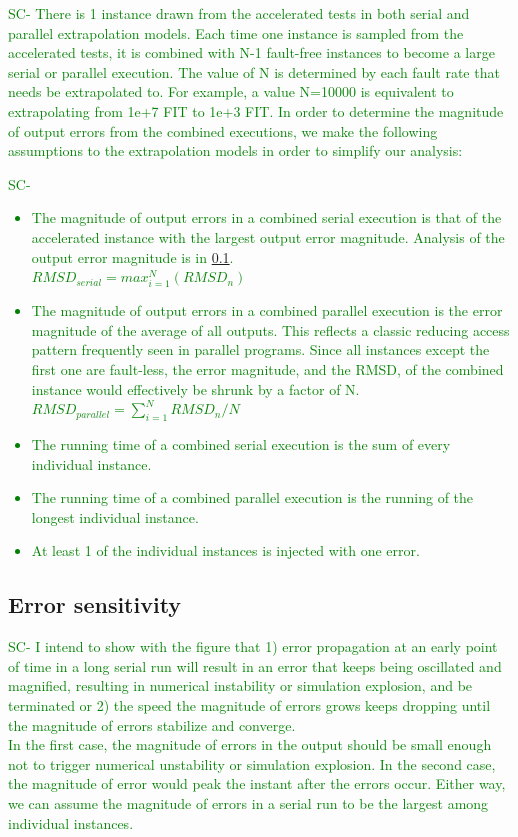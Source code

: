 \documentclass{sig-alternate}
\newcommand{\sui}[1]{%
  \textcolor{green}{SC-#1}
}
\begin{document}
\sui{
There is 1 instance drawn from the accelerated tests in both serial and parallel extrapolation models. Each time one instance is sampled
from the accelerated tests, it is combined with N-1 fault-free instances to become a large serial or parallel execution. The value of N is determined
by each fault rate that needs be extrapolated to. For example, a value N=10000 is equivalent to extrapolating from 1e+7 FIT to 1e+3 FIT.
In order to determine the magnitude of output errors from the combined executions, we make the following assumptions to the extrapolation models
in order to simplify our analysis:
}

\sui{
\begin{itemize}
\item{
The magnitude of output errors in a combined serial execution is that of the accelerated instance with the largest output error magnitude.
Analysis of the output error magnitude is in \ref{sec:eval:errorsensitivity}.\\
$RMSD_{serial} = max_{i=1}^{N} (RMSD_n)$}
\item{The magnitude of output errors in a combined parallel execution is the error magnitude of the average of all outputs. 
This reflects a classic reducing access pattern frequently seen in parallel programs. Since all instances except the first one
are fault-less, the error magnitude, and the RMSD, of the combined instance would effectively be shrunk by a factor of N.\\
$RMSD_{parallel} = \sum_{i=1}^{N}{RMSD_n}/N$
}
\item{The running time of a combined serial execution is the sum of every individual instance.}
\item{The running time of a combined parallel execution is the running of the longest individual instance. }
\item{At least 1 of the individual instances is injected with one error.}
\end{itemize}
}

\subsection{Error sensitivity}
\label{sec:eval:errorsensitivity}
\sui{
	I intend to show with the figure that 1) error propagation at an early point of time in a long serial run will result in an error that keeps being oscillated and magnified, resulting in numerical instability or simulation explosion,
	and be terminated or 2) the speed the magnitude of errors grows keeps dropping until the magnitude of errors stabilize and converge. \\
	In the first case, the magnitude of errors in the output should be small enough not to trigger numerical unstability or simulation explosion. In the second case,
	the magnitude of error would peak the instant after the errors occur. Either way, we can assume the magnitude of errors in a serial run to be the largest among
	individual instances.
}
\end{document}
